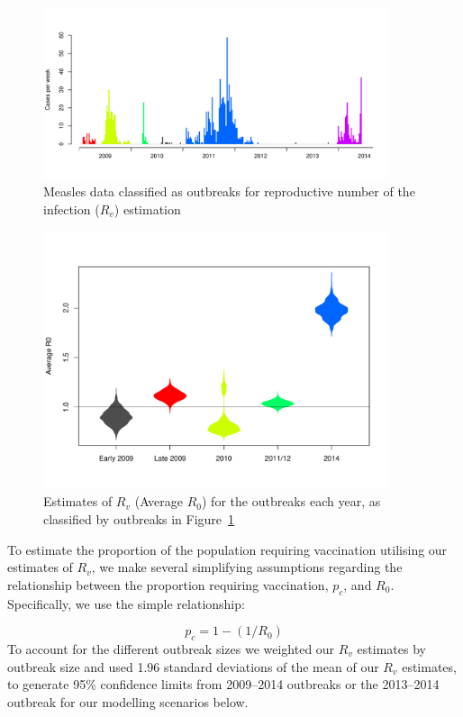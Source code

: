 \documentclass{article}
\begin{document}
\begin{figure}
     \centering
     \includegraphics[width=0.9\textwidth]{outbreaks_for_R0.pdf}
     \caption{Measles data classified as outbreaks for reproductive number of the infection ($R_v$) estimation}
     \label{fig:outbreaks}
\end{figure}

\begin{figure}
     \centering
     \includegraphics[width=0.9\textwidth]{averageR0.pdf}
     \caption{Estimates of $R_v$ (Average $R_0$) for the outbreaks each year, as classified by outbreaks in Figure~\ref{fig:outbreaks}}
     \label{fig:r0}
\end{figure}

To estimate the proportion of the population requiring vaccination utilising our estimates of $R_v$, we make several simplifying assumptions regarding the relationship between the proportion requiring vaccination, $p_c$, and $R_0$. Specifically, we use the simple relationship:

\begin{equation} \label{eq:pc}
p_c = 1-(1/R_0)
  \end{equation}
To account for the different outbreak sizes we weighted our $R_v$ estimates by outbreak size and used 1.96 standard deviations of the mean of our $R_v$ estimates, to generate 95\% confidence limits from 2009--2014 outbreaks or the 2013--2014 outbreak for our modelling scenarios below.
\end{document}
